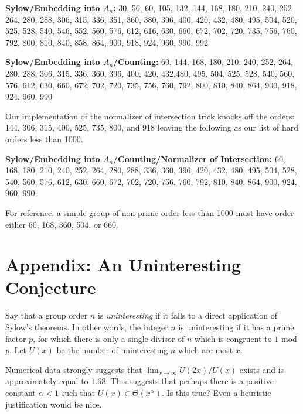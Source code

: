 \documentclass[11pt,
oneside]{article} %
\begin{document}
\textbf{Sylow/Embedding into $A_n$:}
30, 56, 60, 105, 132, 144, 168, 180, 210, 240, 252 264, 280, 288, 306, 315, 336, 351, 360, 380, 396,
400, 420, 432, 480, 495, 504, 520, 525, 528, 540, 546,
552, 560, 576, 612, 616, 630, 660, 672,
702, 720, 735, 756, 760, 792, 800, 810, 840, 858, 864, 900, 918, 924, 960, 990, 992
\newline

\textbf{Sylow/Embedding into $A_n$/Counting:} 60,
144, 168, 180, 210, 240, 252, 264, 280, 288, 306, 315, 336, 360, 396,
400, 420, 432,480, 495, 504, 525, 528, 540, 560, 576,
612, 630, 660, 672, 702, 720, 735, 756, 760, 792, 800, 810,
840, 864, 900, 918, 924, 960, 990
\newline

Our implementation of the normalizer of intersection trick knocks off the orders: 144, 306, 315, 400, 525, 735, 800, and 918 leaving the following as our list of hard orders less than 1000.
\newline

\textbf{Sylow/Embedding into $A_n$/Counting/Normalizer of Intersection:}
60, 168, 180, 210, 240, 252, 264, 280, 288, 336, 360, 396, 420, 432, 480, 495, 504, 528, 540, 560, 576, 612, 630, 660, 672, 702, 720, 756, 760, 792, 810, 
840, 864, 900, 924, 960, 990
\newline

For reference, a simple group of non-prime order less than 1000 must have order either 60, 168, 360, 504, or 660.

\section{Appendix: An Uninteresting Conjecture}
Say that a group order $n$ is \textit{uninteresting} if it falls to a
direct application of Sylow's theorems.  In other words, the integer
$n$ is uninteresting if it has a prime factor $p$, for which there is
only a single divisor of $n$ which is congruent to $1$ mod $p$.  Let
$U(x)$ be the number of uninteresting $n$ which are most $x$.

Numerical data strongly suggests that
$\lim_{x\rightarrow \infty} U(2x)/U(x)$ exists and is approximately
equal to $1.68$.  This suggests that perhaps there is a positive
constant $\alpha < 1$ such that $U(x) \in \Theta(x^{\alpha}).$ Is this
true?  Even a heuristic justification would be nice.
\end{document}
